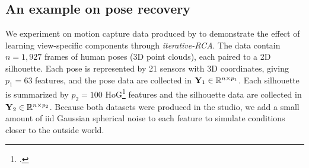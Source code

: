         
    \subsection{An example on pose recovery}      
                  
      We experiment on motion capture data produced by \citet{Agarwal:pose06} to demonstrate the effect of learning view-specific components through \textit{iterative-RCA}.
        The data contain $n = 1,927$ frames of human poses (3D point clouds), each paired to a 2D silhouette.
        Each pose is represented by 21 sensors with 3D coordinates, giving $p_1 = 63$ features, and the pose data are collected in $\mathbf{Y}_1 \in \mathbb{R}^{n \times p_1}$.
        Each silhouette is summarized by $p_2 = 100$ HoG\footnote{\citet{Dalal:histograms05}.} features and the silhouette data are collected in $\mathbf{Y}_2 \in \mathbb{R}^{n \times p_2}$.
        Because both datasets were produced in the studio, we add a small amount of iid Gaussian spherical noise to each feature to simulate conditions closer to the outside world.
        
